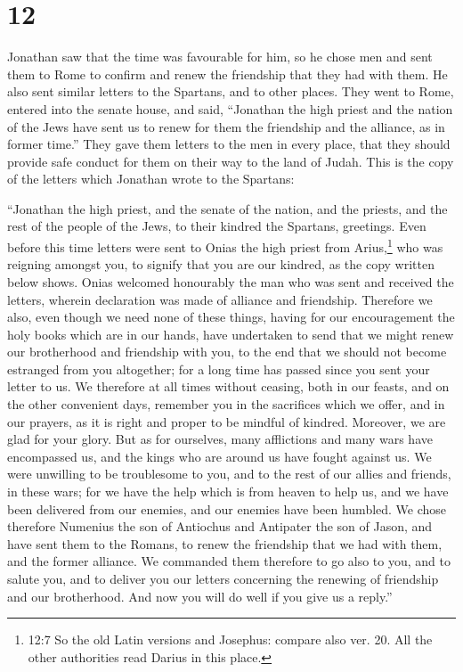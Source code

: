 \hypertarget{section-11}{%
\section{12}\label{section-11}}

 Jonathan saw that the time was favourable for him, so he
chose men and sent them to Rome to confirm and renew the friendship that
they had with them.  He also sent similar letters to the
Spartans, and to other places.  They went to Rome, entered
into the senate house, and said, ``Jonathan the high priest and the
nation of the Jews have sent us to renew for them the friendship and the
alliance, as in former time.''  They gave them letters to
the men in every place, that they should provide safe conduct for them
on their way to the land of Judah.  This is the copy of the
letters which Jonathan wrote to the Spartans:

 ``Jonathan the high priest, and the senate of the nation,
and the priests, and the rest of the people of the Jews, to their
kindred the Spartans, greetings.  Even before this time
letters were sent to Onias the high priest from Arius,\footnote{12:7 So
  the old Latin versions and Josephus: compare also ver. 20. All the
  other authorities read Darius in this place.} who was reigning amongst
you, to signify that you are our kindred, as the copy written below
shows.  Onias welcomed honourably the man who was sent and
received the letters, wherein declaration was made of alliance and
friendship.  Therefore we also, even though we need none of
these things, having for our encouragement the holy books which are in
our hands,  have undertaken to send that we might renew our
brotherhood and friendship with you, to the end that we should not
become estranged from you altogether; for a long time has passed since
you sent your letter to us.  We therefore at all times
without ceasing, both in our feasts, and on the other convenient days,
remember you in the sacrifices which we offer, and in our prayers, as it
is right and proper to be mindful of kindred.  Moreover, we
are glad for your glory.  But as for ourselves, many
afflictions and many wars have encompassed us, and the kings who are
around us have fought against us.  We were unwilling to be
troublesome to you, and to the rest of our allies and friends, in these
wars;  for we have the help which is from heaven to help
us, and we have been delivered from our enemies, and our enemies have
been humbled.  We chose therefore Numenius the son of
Antiochus and Antipater the son of Jason, and have sent them to the
Romans, to renew the friendship that we had with them, and the former
alliance.  We commanded them therefore to go also to you,
and to salute you, and to deliver you our letters concerning the
renewing of friendship and our brotherhood.  And now you
will do well if you give us a reply.''

